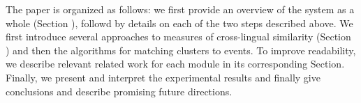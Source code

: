 \documentclass[twoside,11pt]{article}
\newcommand{\oldText}[1]{\textcolor{red}{#1:}\color{blue}}
\begin{document}
The paper is organized as follows: we first provide an overview of the system as a whole (Section ), followd by details on each of the two steps described above. We first introduce several approaches to measures of cross-lingual similarity (Section ) and then the algorithms for matching clusters to events.  To improve readability, we describe relevant related work for each module in its corresponding Section.
Finally, we present and interpret the experimental results and finally give conclusions and describe promising future directions. 
%
%
%
%
%
\end{document}
